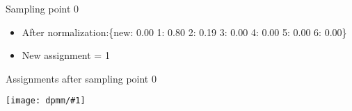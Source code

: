 \documentclass[compress]{beamer}
\newcommand{\gfx}[2]{
\begin{center}
	\texttt{[image: dpmm/\#1]}
\end{center}
}
\begin{document}
\begin{frame}{Sampling point 0}
\begin{itemize}
\begin{tiny}
\begin{align}
{p(z_{0} = 4\,|\, \vec{z_{-0}}, \vec{x}, \alpha) & \propto \frac{1.00}{6 + 0.25} \mathcal{N} \left( \begin{array}{c} 10.00 \\ 10.00 \\ \end{array} \, \g \, \begin{array}{c} -2.50 \\ -5.00 \\ \end{array}, \mathbb{1} \right) = 0.16 \times 0.00000\\
p(z_{0} = 5\,|\, \vec{z_{-0}}, \vec{x}, \alpha) & \propto \frac{1.00}{6 + 0.25} \mathcal{N} \left( \begin{array}{c} 10.00 \\ 10.00 \\ \end{array} \, \g \, \begin{array}{c} -3.50 \\ -3.50 \\ \end{array}, \mathbb{1} \right) = 0.16 \times 0.00000\\
p(z_{0} = 6\,|\, \vec{z_{-0}}, \vec{x}, \alpha) & \propto \frac{1.00}{6 + 0.25} \mathcal{N} \left( \begin{array}{c} 10.00 \\ 10.00 \\ \end{array} \, \g \, \begin{array}{c} 0.50 \\ 0.50 \\ \end{array}, \mathbb{1} \right) = 0.16 \times 0.00000}
\end{align}\end{tiny}

\item<7-> After normalization:\{new: 0.00	1: 0.80	2: 0.19	3: 0.00	4: 0.00
  5: 0.00	6: 0.00\}
\item<8-> New assignment = 1
\end{itemize}
\end{frame}



\begin{frame}{Assignments after sampling point 0}
    \gfx{dpmm1}{.8}
    \end{frame}
\end{document}

